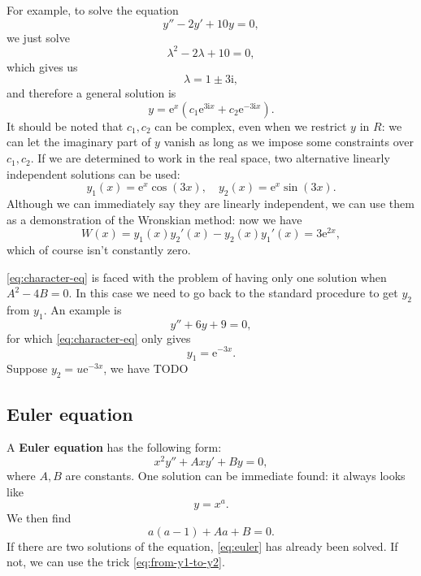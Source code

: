 \documentclass[hyperref, a4paper]{article}
\newcommand*{\ii}{\mathrm{i}}
\newcommand*{\ee}{\mathrm{e}}
\newcommand*{\concept}[1]{{\textbf{#1}}}
\def\mathbb#1{#1}%
\begin{document}
For example, to solve the equation 
\begin{equation}
    y'' - 2 y' + 10 y = 0,
\end{equation}
we just solve 
\[
    \lambda^2 - 2 \lambda + 10 = 0,
\]
which gives us 
\begin{equation}
    \lambda = 1 \pm 3 \ii,
\end{equation}
and therefore a general solution is 
\begin{equation}
    y = \ee^{x} (c_1 \ee^{3 \ii x} + c_2 \ee^{- 3 \ii x}).
\end{equation}
It should be noted that $c_1, c_2$ can be complex,
even when we restrict $y$ in $\mathbb{R}$:
we can let the imaginary part of $y$ vanish 
as long as we impose some constraints over $c_1, c_2$.
If we are determined to work in the real space, 
two alternative linearly independent solutions can be used:
\begin{equation}
    y_1(x) = \ee^{x} \cos(3x), \quad 
    y_2(x) = \ee^{x} \sin(3x).
\end{equation}
Although we can immediately say 
they are linearly independent,
we can use them as a demonstration of the 
Wronskian method: 
now we have 
\begin{equation}
    W(x) = y_1(x) y_2'(x) - y_2(x) y_1'(x) = 3 \ee^{2x},
\end{equation}
which of course isn't constantly zero.

\eqref{eq:character-eq} is faced with the problem 
of having only one solution 
when $A^2 - 4B = 0$.
In this case we need to go back to the standard procedure 
to get $y_2$ from $y_1$.
An example is 
\begin{equation}
    y'' + 6y + 9 = 0,
\end{equation}
for which \eqref{eq:character-eq} only gives 
\begin{equation}
    y_1 = \ee^{-3x}.
\end{equation}
Suppose $y_2 = u \ee^{-3x}$, we have TODO 

\subsection{Euler equation}

A \concept{Euler equation} has the following form:
\begin{equation}
    x^2 y'' + A x y' + B y = 0,
    \label{eq:euler}
\end{equation}
where $A, B$ are constants.
One solution can be immediate found: it always looks like 
\begin{equation}
    y = x^a.
\end{equation}
We then find 
\begin{equation}
    a(a-1) + A a + B = 0.
\end{equation}
If there are two solutions of the equation, 
\eqref{eq:euler} has already been solved.
If not, we can use the trick \eqref{eq:from-y1-to-y2}.
\end{document}
